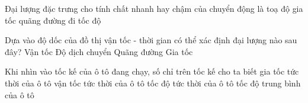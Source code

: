 \begin{ex}
	Đại lượng đặc trưng cho tính chất nhanh hay chậm của chuyển động là 
	\choice
	{toạ độ}
	{gia tốc}
	{quãng đường đi}
	{\True tốc độ}
	\loigiai{}
\end{ex}
\begin{ex}
	Dựa vào độ dốc của đồ thị vận tốc - thời gian có thể xác định đại lượng nào sau đây?
	\choice
	{Vận tốc}
	{Độ dịch chuyển}
	{Quãng đường}
	{\True Gia tốc}
	\loigiai{}
\end{ex}
\begin{ex}
	Khi nhìn vào tốc kế của ô tô đang chạy, số chỉ trên tốc kế cho ta biết
	\choice
	{gia tốc tức thời của ô tô}
	{vận tốc tức thời của ô tô}
	{\True tốc độ tức thời của ô tô}
	{tốc độ trung bình của ô tô}
	\loigiai{}
\end{ex}

